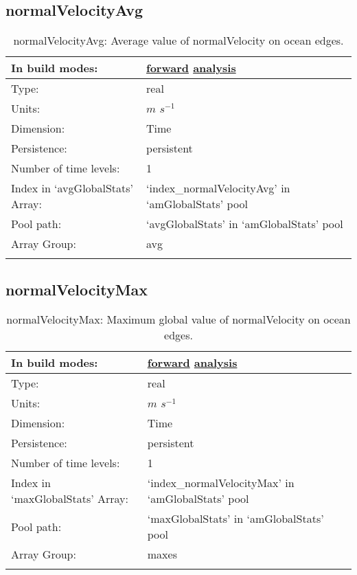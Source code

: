 \subsection[normalVelocityAvg]{normalVelocityAvg}
\label{subsec:var_sec_amGlobalStats_normalVelocityAvg}
\begin{center}
\begin{longtable}{| p{2.0in} | p{4.0in} |}
        \hline 
        In build modes: & \hyperref[subsec:forward_var_tab_amGlobalStats]{forward} \hyperref[subsec:analysis_var_tab_amGlobalStats]{analysis} \\
        \hline 
        Type: & real \\
        \hline 
        Units: & $m$ $s^{-1}$ \\
        \hline 
        Dimension: & Time \\
        \hline 
        Persistence: & persistent \\
        \hline 
        Number of time levels: & 1 \\
        \hline 
		 Index in `avgGlobalStats' Array: & `index\_normalVelocityAvg' in `amGlobalStats' pool \\
		 \hline 
            Pool path: & `avgGlobalStats' in `amGlobalStats' pool \\
		 \hline 
		 Array Group: & avg \\
		 \hline 
    \caption{normalVelocityAvg: Average value of normalVelocity on ocean edges.}
\end{longtable}
\end{center}
\subsection[normalVelocityMax]{normalVelocityMax}
\label{subsec:var_sec_amGlobalStats_normalVelocityMax}
\begin{center}
\begin{longtable}{| p{2.0in} | p{4.0in} |}
        \hline 
        In build modes: & \hyperref[subsec:forward_var_tab_amGlobalStats]{forward} \hyperref[subsec:analysis_var_tab_amGlobalStats]{analysis} \\
        \hline 
        Type: & real \\
        \hline 
        Units: & $m$ $s^{-1}$ \\
        \hline 
        Dimension: & Time \\
        \hline 
        Persistence: & persistent \\
        \hline 
        Number of time levels: & 1 \\
        \hline 
		 Index in `maxGlobalStats' Array: & `index\_normalVelocityMax' in `amGlobalStats' pool \\
		 \hline 
            Pool path: & `maxGlobalStats' in `amGlobalStats' pool \\
		 \hline 
		 Array Group: & maxes \\
		 \hline 
    \caption{normalVelocityMax: Maximum global value of normalVelocity on ocean edges.}
\end{longtable}
\end{center}
